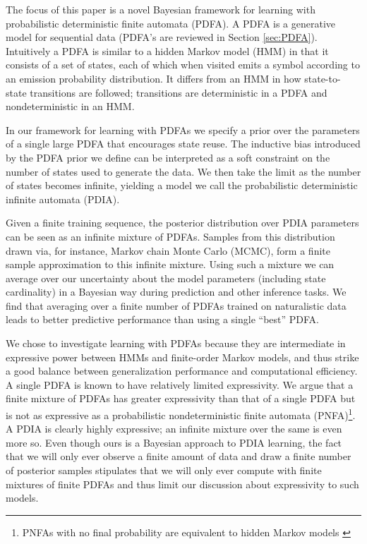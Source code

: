 The focus of this paper is a novel Bayesian framework for learning with probabilistic deterministic finite automata (PDFA).  A PDFA is a generative model for sequential data (PDFA's are reviewed in  Section \ref{sec:PDFA}).  Intuitively a PDFA is similar to a hidden Markov model (HMM) in that it consists of a set of states, each of which when visited emits a symbol according to an emission probability distribution.  It differs from an HMM in how state-to-state transitions are followed; transitions are deterministic in a PDFA and nondeterministic in an HMM.  

In our framework for learning with PDFAs we specify a prior over the parameters of a single large PDFA that encourages state reuse.  The inductive bias introduced by the PDFA prior we define can be interpreted as a soft constraint on the number of states used to generate the data.  We then take the limit as the number of states becomes infinite, yielding a model we call the probabilistic deterministic infinite automata (PDIA).  

Given a finite training sequence, the posterior distribution over PDIA parameters can be seen as an infinite mixture of PDFAs.  Samples from this distribution drawn via, for instance, Markov chain Monte Carlo (MCMC), form a finite sample approximation to this infinite mixture.  Using such a mixture we can average over our uncertainty about the model parameters (including state cardinality) in a Bayesian way during prediction and other inference tasks.  We find that averaging over a finite number of PDFAs trained on naturalistic data leads to better predictive performance than using a single ``best'' PDFA.  

We chose to investigate learning with PDFAs because they are intermediate in expressive power between HMMs and finite-order Markov models, and thus strike a good balance between generalization performance and computational efficiency.  A single PDFA is known to have relatively limited expressivity.  We argue that a finite mixture of PDFAs has greater expressivity than that of a single PDFA but is not as expressive as a probabilistic nondeterministic finite automata (PNFA)\footnote{PNFAs with no final probability are equivalent to hidden Markov models \cite{Dupont2005} \label{fn:pnfa}}.  A PDIA is clearly highly expressive; an infinite mixture over the same is even more so.  Even though ours is a Bayesian approach to PDIA learning, the fact that we will only ever observe a finite amount of data and draw a finite number of posterior samples stipulates that we will only ever compute with finite mixtures of finite PDFAs and thus limit our discussion about expressivity to such models.   

